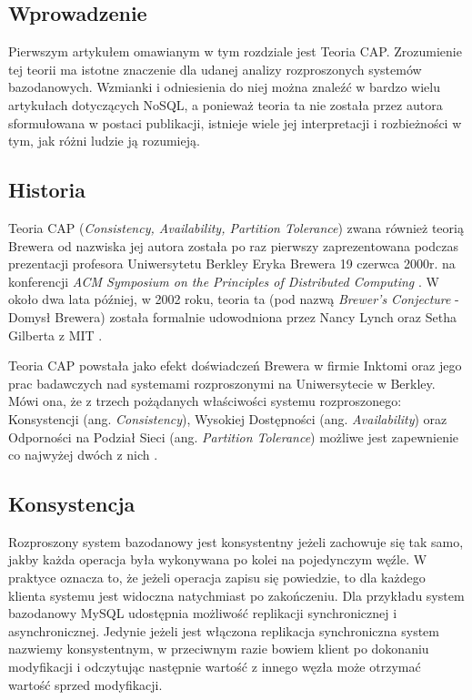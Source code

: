 \subsection*{Wprowadzenie}

Pierwszym artykułem omawianym w tym rozdziale jest Teoria CAP.
Zrozumienie tej teorii ma istotne znaczenie dla udanej analizy rozproszonych systemów bazodanowych.
Wzmianki i odniesienia do niej można znaleźć w bardzo wielu artykułach dotyczących NoSQL, a ponieważ teoria ta nie została przez autora sformułowana w postaci publikacji, istnieje wiele jej interpretacji i rozbieżności w tym, jak różni ludzie ją rozumieją.

\subsection*{Historia}

Teoria CAP (\emph{Consistency, Availability, Partition Tolerance}) zwana również teorią Brewera od nazwiska jej autora została po raz pierwszy zaprezentowana podczas prezentacji profesora Uniwersytetu Berkley Eryka Brewera 19 czerwca 2000r. na konferencji \emph{ACM Symposium on the Principles of Distributed Computing} \cite{podc-keynote}. 
W około dwa lata później, w 2002 roku, teoria ta (pod nazwą \emph{Brewer's Conjecture} - Domysł Brewera) została formalnie udowodniona przez Nancy Lynch oraz Setha Gilberta z MIT \cite{brewers-conjecture}.

Teoria CAP powstała jako efekt doświadczeń Brewera w firmie Inktomi oraz jego prac badawczych nad systemami rozproszonymi na Uniwersytecie w Berkley. 
Mówi ona, że z trzech pożądanych właściwości systemu rozproszonego: Konsystencji (ang. \emph{Consistency}), Wysokiej Dostępności (ang. \emph{Availability}) oraz Odporności na Podział Sieci (ang. \emph{Partition Tolerance}) możliwe jest zapewnienie co najwyżej dwóch z nich \cite{browne-cap-theorem}.

\subsection*{Konsystencja}

Rozproszony system bazodanowy jest konsystentny jeżeli zachowuje się tak samo, jakby każda operacja była wykonywana po kolei na pojedynczym węźle.
W praktyce oznacza to, że jeżeli operacja zapisu się powiedzie, to dla każdego klienta systemu jest widoczna natychmiast po zakończeniu.
Dla przykładu system bazodanowy MySQL udostępnia możliwość replikacji synchronicznej i asynchronicznej.
Jedynie jeżeli jest włączona replikacja synchroniczna system nazwiemy konsystentnym, w przeciwnym razie bowiem klient po dokonaniu modyfikacji i odczytując następnie wartość z innego węzła może otrzymać wartość sprzed modyfikacji.
 
